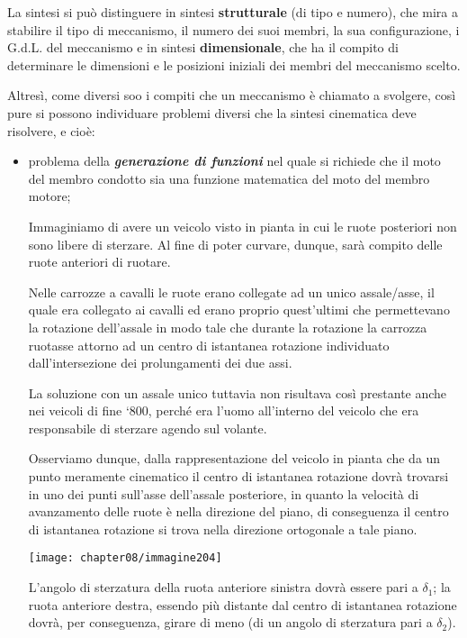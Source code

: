 La sintesi si può distinguere in sintesi \textbf{strutturale} (di tipo e numero), che mira a stabilire il tipo di meccanismo, il numero dei suoi membri, la sua configurazione, i G.d.L. del meccanismo e in sintesi \textbf{dimensionale}, che ha il compito di determinare le dimensioni e le posizioni iniziali dei membri del meccanismo scelto.

Altresì, come diversi soo i compiti che un meccanismo è chiamato a svolgere, così pure si possono individuare problemi diversi che la sintesi cinematica deve risolvere, e cioè:
\begin{itemize}
\item problema della {\bfseries\emph{generazione di funzioni}} nel quale si richiede che il moto del membro condotto sia una funzione matematica del moto del membro motore;

Immaginiamo di avere un veicolo visto in pianta in cui le ruote posteriori non sono libere di sterzare. Al fine di poter curvare, dunque, sarà compito delle ruote anteriori di ruotare.

Nelle carrozze a cavalli le ruote erano collegate ad un unico assale/asse, il quale era collegato ai cavalli ed erano proprio quest'ultimi che permettevano la rotazione dell'assale in modo tale che durante la rotazione la carrozza ruotasse attorno ad un centro di istantanea rotazione individuato dall'intersezione dei prolungamenti dei due assi.

La soluzione con un assale unico tuttavia non risultava così prestante anche nei veicoli di fine `800, perché era l'uomo all'interno del veicolo che era responsabile di sterzare agendo sul volante.

Osserviamo dunque, dalla rappresentazione del veicolo in pianta che da un punto meramente cinematico il centro di istantanea rotazione dovrà trovarsi in uno dei punti sull'asse dell'assale posteriore, in quanto la velocità di avanzamento delle ruote è nella direzione del piano, di conseguenza il centro di istantanea rotazione si trova nella direzione ortogonale a tale piano.

\begin{center}
\texttt{[image: chapter08/immagine204]}
\end{center}

L'angolo di sterzatura della ruota anteriore sinistra dovrà essere pari a $\delta_1$; la ruota anteriore destra, essendo più distante dal centro di istantanea rotazione dovrà, per conseguenza, girare di meno (di un angolo di sterzatura pari a $\delta_2$).


\end{itemize}

